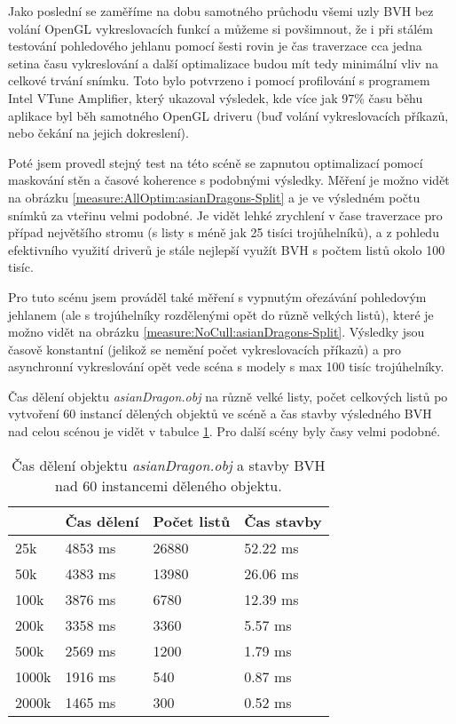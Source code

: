 \documentclass[report,11pt]{elsarticle}
\begin{document}
Jako poslední se zaměříme na dobu samotného průchodu všemi uzly BVH bez volání
OpenGL vykreslovacích funkcí a můžeme si povšimnout, že i při stálém testování
pohledového jehlanu pomocí šesti rovin je čas traverzace cca jedna setina času
vykreslování a další optimalizace budou mít tedy minimální vliv na celkové trvání
snímku. Toto bylo potvrzeno i pomocí profilování s programem Intel VTune Amplifier,
který ukazoval výsledek, kde více jak 97\% času běhu aplikace byl běh samotného OpenGL
driveru (buď volání vykreslovacích příkazů, nebo čekání na jejich dokreslení).

Poté jsem provedl stejný test na této scéně se zapnutou optimalizací pomocí
maskování stěn a časové koherence s podobnými výsledky. Měření je možno vidět na
obrázku \ref{measure:AllOptim:asianDragons-Split} a je ve výsledném počtu snímků
za vteřinu velmi podobné. Je vidět lehké zrychlení v čase traverzace pro případ
největšího stromu (s listy s méně jak 25 tisíci trojůhelníků), a z pohledu
efektivního využití driverů je stále nejlepší využít BVH s počtem listů okolo
100 tisíc.

Pro tuto scénu jsem prováděl také měření s vypnutým ořezávání pohledovým jehlanem
(ale s trojúhelníky rozdělenými opět do různě velkých listů), které je možno vidět
na obrázku \ref{measure:NoCull:asianDragons-Split}. Výsledky jsou časově
konstantní (jelikož se nemění počet vykreslovacích příkazů) a pro asynchronní
vykreslování opět vede scéna s modely s max 100 tisíc trojúhelníky.

Čas dělení objektu \textit{asianDragon.obj} na různě velké listy, počet celkových
listů po vytvoření 60 instancí dělených objektů ve scéně a čas stavby výsledného
BVH nad celou scénou je vidět v tabulce \ref{table:desktop:asianDragon}. Pro další scény
byly časy velmi podobné.

\begin{table}[]
\begin{center}
\begin{tabular}{l|lll}
      & Čas dělení & Počet listů & Čas stavby \\ \hline
25k   & 4853 ms    & 26880       & 52.22 ms   \\
50k   & 4383 ms    & 13980       & 26.06 ms   \\
100k  & 3876 ms    & 6780        & 12.39 ms   \\
200k  & 3358 ms    & 3360        & 5.57 ms    \\
500k  & 2569 ms    & 1200        & 1.79 ms    \\
1000k & 1916 ms    & 540         & 0.87 ms    \\
2000k & 1465 ms    & 300         & 0.52 ms
\end{tabular}
\end{center}
\caption{Čas dělení objektu \textit{asianDragon.obj} a stavby BVH nad 60 instancemi děleného objektu.}
\label{table:desktop:asianDragon}
\end{table}
\end{document}
